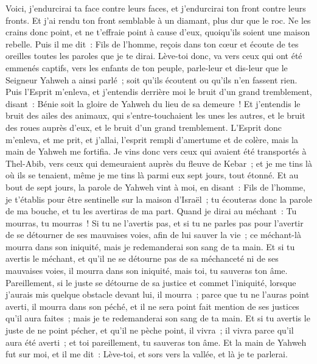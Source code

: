 \begin{multicols}{2}
Voici, j'endurcirai ta face contre leurs faces, et j'endurcirai ton front contre leurs fronts.
Et j'ai rendu ton front semblable à un diamant, plus dur que le roc. Ne les crains donc point, et ne t'effraie point à cause d'eux, quoiqu'ils soient une maison rebelle.
Puis il me dit~: Fils de l'homme, reçois dans ton cœur et écoute de tes oreilles toutes les paroles que je te dirai.
Lève-toi donc, va vers ceux qui ont été emmenés captifs, vers les enfants de ton peuple, parle-leur et dis-leur que le Seigneur Yahweh a ainsi parlé~; soit qu'ils écoutent ou qu'ils n'en fassent rien.
Puis l'Esprit m'enleva, et j'entendis derrière moi le bruit d'un grand tremblement, disant~: Bénie soit la gloire de Yahweh du lieu de sa demeure~!
Et j'entendis le bruit des ailes des animaux, qui s'entre-touchaient les unes les autres, et le bruit des roues auprès d'eux, et le bruit d'un grand tremblement.
L'Esprit donc m'enleva, et me prit, et j'allai, l'esprit rempli d'amertume et de colère, mais la main de Yahweh me fortifia.
Je vins donc vers ceux qui avaient été transportés à Thel-Abib, vers ceux qui demeuraient auprès du fleuve de Kebar~; et je me tins là où ils se tenaient, même je me tins là parmi eux sept jours, tout étonné.
Et au bout de sept jours, la parole de Yahweh vint à moi, en disant~:
Fils de l'homme, je t'établis pour être sentinelle sur la maison d'Israël~; tu écouteras donc la parole de ma bouche, et tu les avertiras de ma part.
Quand je dirai au méchant~: Tu mourras, tu mourras~! Si tu ne l'avertis pas, et si tu ne parles pas pour l'avertir de se détourner de ses mauvaises voies, afin de lui sauver la vie~; ce méchant-là mourra dans son iniquité, mais je redemanderai son sang de ta main.
Et si tu avertis le méchant, et qu'il ne se détourne pas de sa méchanceté ni de ses mauvaises voies, il mourra dans son iniquité, mais toi, tu sauveras ton âme.
Pareillement, si le juste se détourne de sa justice et commet l'iniquité, lorsque j'aurais mis quelque obstacle devant lui, il mourra~; parce que tu ne l'auras point averti, il mourra dans son péché, et il ne sera point fait mention de ses justices qu'il aura faites~; mais je te redemanderai son sang de ta main.
Et si tu avertis le juste de ne point pécher, et qu'il ne pèche point, il vivra~; il vivra parce qu'il aura été averti~; et toi pareillement, tu sauveras ton âme.
Et la main de Yahweh fut sur moi, et il me dit~: Lève-toi, et sors vers la vallée, et là je te parlerai.

\end{multicols}
